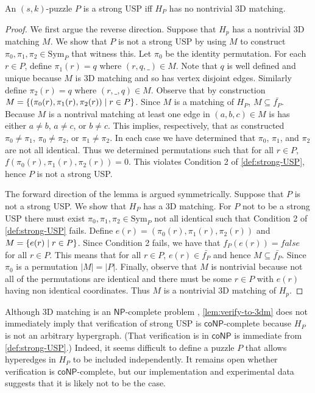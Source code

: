 \documentclass[11pt]{article}
\newcommand\sse{\subseteq}
\newcommand\Sym[1]{\ensuremath{\mathrm{Sym}_{#1}}}
\newcommand\condset[2]{\set{#1 \;|\; #2}}
\renewcommand\NP{\ensuremath{\mathsf{NP}}}
\newcommand\coNP{\ensuremath{\mathsf{coNP}}}
\begin{document}
\begin{lemma}
  \label{lem:verify-to-3dm}
  An $(s,k)$-puzzle $P$ is a strong USP iff $H_P$ has no nontrivial 3D
  matching.
\end{lemma}

\begin{proof}
  We first argue the reverse direction.  Suppose that $H_p$ has a
  nontrivial 3D matching $M$.  We show that $P$ is not a strong USP by
  using $M$ to construct $\pi_0, \pi_1, \pi_2 \in \Sym{P}$ that
  witness this.  Let $\pi_0$ be the identity permutation.  For each $r
  \in P$, define $\pi_1(r) = q$ where $(r,q,\_) \in M$.  Note that $q$
  is well defined and unique because $M$ is 3D matching and so has
  vertex disjoint edges.  Similarly define $\pi_2(r) = q$ where
  $(r,\_,q) \in M$.  Observe that by construction $M =
  \condset{(\pi_0(r),\pi_1(r),\pi_2(r))}{r \in P}$.  Since $M$ is a
  matching of $H_P$, $M \sse \bar{f_P}$.  Because $M$ is a nontrival
  matching at least one edge in $(a,b,c) \in M$ is has either $a \neq
  b$, $a \neq c$, or $b \neq c$.  This implies, respectively, that as
  constructed $\pi_0 \neq \pi_1$, $\pi_0 \neq \pi_2$, or $\pi_1 \neq
  \pi_2$.  In each case we have determined that $\pi_0$, $\pi_1$, and
  $\pi_2$ are not all identical.  Thus we determined permutations such
  that for all $r \in P$, $f(\pi_0(r), \pi_1(r), \pi_2(r)) = 0$.  This
  violates Condition 2 of \autoref{def:strong-USP}, hence $P$ is not a
  strong USP.

  The forward direction of the lemma is argued symmetrically.  Suppose
  that $P$ is not a strong USP. We show that $H_P$ has a 3D matching.
  For $P$ not to be a strong USP there must exist $\pi_0, \pi_1, \pi_2
  \in \Sym{P}$ not all identical such that Condition 2 of
  \autoref{def:strong-USP} fails.  Define $e(r) =
  (\pi_0(r),\pi_1(r),\pi_2(r))$ and $M = \condset{e(r)}{r \in P}$.
  Since Condition 2 fails, we have that $f_P(e(r)) = false$ for all $r
  \in P$.  This means that for all $r \in P$, $e(r) \in \bar{f_P}$ and
  hence $M \sse \bar{f_P}$.  Since $\pi_0$ is a permutation $|M| =
  |P|$.  Finally, observe that $M$ is nontrivial because not all of
  the permutations are identical and there must be some $r \in P$ with
  $e(r)$ having non identical coordinates.  Thus $M$ is a nontrivial
  3D matching of $H_p$.
\end{proof}

Although 3D matching is an \NP-complete problem \cite{gj79},
\autoref{lem:verify-to-3dm} does not immediately imply that
verification of strong USP is \coNP-complete because $H_P$ is not an
arbitrary hypergraph.  (That verification is in \coNP{} is immediate
from \autoref{def:strong-USP}.)  Indeed, it seems difficult to define
a puzzle $P$ that allows hyperedges in $H_P$ to be included
independently.  It remains open whether verification is
\coNP-complete, but our implementation and experimental data suggests
that it is likely not to be the case.
\end{document}
